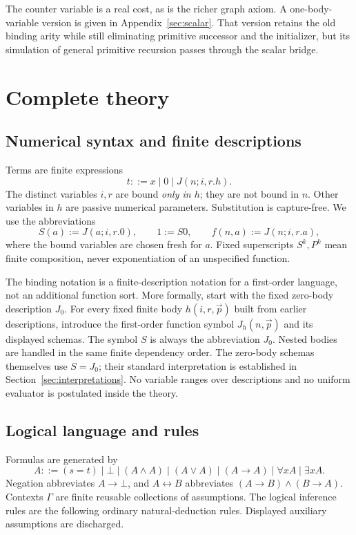 \documentclass[11pt,letterpaper]{article}
\theoremstyle{definition}\newtheorem{definition}[theorem]{Definition}
\theoremstyle{remark}\newtheorem{remark}[theorem]{Remark}
\begin{document}
The counter variable is a real cost, as is the richer graph axiom.
A one-body-variable version is given in Appendix~\ref{sec:scalar}.
That version retains the old binding arity while still eliminating
primitive successor and the initializer, but its simulation of general
primitive recursion passes through the scalar bridge.

\section{Complete theory}\label{sec:theory}

\subsection{Numerical syntax and finite descriptions}

Terms are finite expressions
\[
 t::=x\mid0\mid J(n;i,r.h).
\]
The distinct variables $i,r$ are bound \emph{only in $h$}; they are not
bound in $n$. Other variables in $h$ are passive numerical parameters.
Substitution is capture-free. We use the abbreviations
\[
 S(a):=J(a;i,r.0),\qquad 1:=S0,\qquad
 f(n,a):=J(n;i,r.a),
\]
where the bound variables are chosen fresh for $a$. Fixed superscripts
$S^k,P^k$ mean finite composition, never exponentiation of an unspecified
function.

The binding notation is a finite-description notation for a first-order
language, not an additional function sort. More formally, start with
the fixed zero-body description $J_0$. For every fixed finite body
$h(i,r,\vec p)$ built from earlier descriptions, introduce the
first-order function symbol $J_h(n,\vec p)$ and its displayed schemas.
The symbol $S$ is always the abbreviation $J_0$.
Nested bodies are handled in the same finite dependency order.
The zero-body schemas themselves use $S=J_0$; their standard
interpretation is established in Section~\ref{sec:interpretations}.
No variable ranges over descriptions and no uniform evaluator is
postulated inside the theory.

\subsection{Logical language and rules}\label{sec:logic}

Formulas are generated by
\[
 A::=(s=t)\mid\bot\mid(A\land A)\mid(A\lor A)\mid(A\to A)
       \mid\forall x A\mid\exists x A.
\]
Negation abbreviates $A\to\bot$, and $A\leftrightarrow B$
abbreviates $(A\to B)\land(B\to A)$.
Contexts $\Gamma$ are finite reusable collections of assumptions.
The logical inference rules are the following ordinary natural-deduction
rules. Displayed auxiliary assumptions are discharged.
\end{document}
